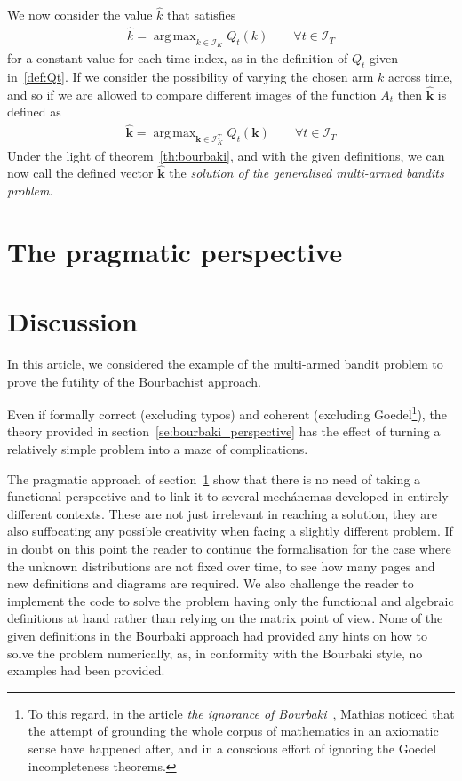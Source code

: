 \documentclass[]{scrartcl}
\DeclareMathOperator*{\argmax}{arg\,max}
\theoremstyle{definition}
\begin{document}
We now consider the value $\hat{k}$ that satisfies
\begin{align*}
\hat{k} = \argmax_{k \in \mathcal{I}_K} Q_t(k)
\qquad
\forall t \in \mathcal{I}_T
\end{align*}
for a constant value for each time index, as in the definition of $Q_t$ given in~\ref{def:Qt}. 
If we consider the possibility of varying the chosen arm $k$ across time, and so if we are allowed to compare different images of the function $A_t$ then $\hat{\mathbf{k}}$ is defined as
\begin{align}\label{eq:bourbaki_solution}
\hat{\mathbf{k}} 
= 
\argmax_{\mathbf{k} \in \mathcal{I}_K^{T}} Q_t(\mathbf{k})
\qquad
\forall t \in \mathcal{I}_T
\end{align}
Under the light of theorem~\ref{th:bourbaki}, and with the given definitions, we can now call the defined vector $\hat{\mathbf{k}}$ the \emph{solution of the generalised multi-armed bandits problem}.

\section{The pragmatic perspective}
\label{se:pragmatic_perspective}


\section{Discussion}
\label{se:outro}
In this article, we considered the example of the multi-armed bandit problem to prove the futility of the Bourbachist approach. 

Even if formally correct (excluding typos) and coherent (excluding Goedel\footnote{
    To this regard, in the article \emph{the ignorance of Bourbaki}~\cite{mathias1992ignorance}, Mathias noticed that the attempt of grounding the whole corpus of mathematics in an axiomatic sense have happened after, and in a conscious effort of ignoring the Goedel incompleteness theorems.
}), the theory provided in section~\ref{se:bourbaki_perspective} has the effect of turning a relatively simple problem into a maze of complications.

The pragmatic approach of section~\ref{se:pragmatic_perspective} show that there is no need of taking a functional perspective and to link it to several mechánemas developed in entirely different contexts. These are not just irrelevant in reaching a solution, they are also suffocating any possible creativity when facing a slightly different problem. If in doubt on this point the reader to continue the formalisation for the case where the unknown distributions are not fixed over time, to see how many pages and new definitions and diagrams are required. We also challenge the reader to implement the code to solve the problem having only the functional and algebraic definitions at hand rather than relying on the matrix point of view. None of the given definitions in the Bourbaki approach had provided any hints on how to solve the problem numerically, as, in conformity with the Bourbaki style, no examples had been provided. 
\end{document}
